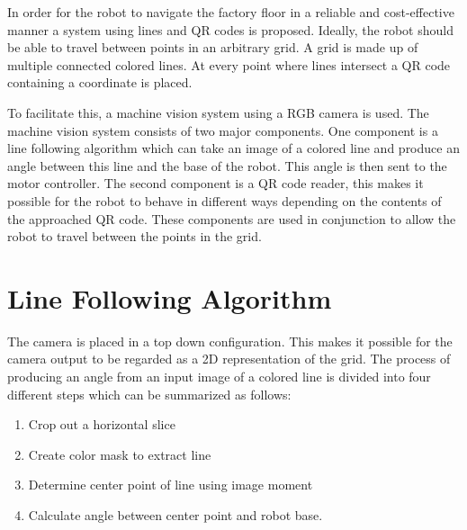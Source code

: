 In order for the robot to navigate the factory floor in a reliable and cost-effective manner a system using lines and QR codes is proposed.
Ideally, the robot should be able to travel between points in an arbitrary grid.
A grid is made up of multiple connected colored lines.
At every point where lines intersect a QR code containing a coordinate is placed.

To facilitate this, a machine vision system using a RGB camera is used. The machine vision system consists of two major components.
One component is a line following algorithm which can take an image of a colored line and produce an angle between this line and the base of the robot. This angle is then sent to the motor controller.
The second component is a QR code reader, this makes it possible for the robot to behave in different ways depending on the contents of the approached QR code.
These components are used in conjunction to allow the robot to travel between the points in the grid.

\section*{Line Following Algorithm}
The camera is placed in a top down configuration. This makes it possible for the camera output to be regarded as a 2D representation of the grid.
The process of producing an angle from an input image of a colored line is divided into four different steps which can be summarized as follows:

\begin{enumerate}
    \item Crop out a horizontal slice
    \item Create color mask to extract line
    \item Determine center point of line using image moment
    \item Calculate angle between center point and robot base.
\end{enumerate}

